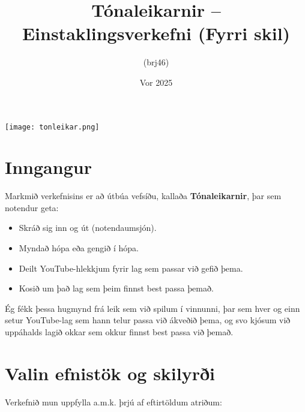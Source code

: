 \documentclass{article}
\title{Tónaleikarnir – Einstaklingsverkefni (Fyrri skil)}
\author{(brj46)}
\date{Vor 2025}
\begin{document}
\maketitle

\vspace{2em}

\begin{center}
    \texttt{[image: tonleikar.png]}
\end{center}

\newpage

\section{Inngangur}
Markmið verkefnisins er að útbúa vefsíðu, kallaða \textbf{Tónaleikarnir}, þar sem notendur geta:
\begin{itemize}
    \item Skráð sig inn og út (notendaumsjón).
    \item Myndað hópa eða gengið í hópa.
    \item Deilt YouTube-hlekkjum fyrir lag sem passar við gefið þema.
    \item Kosið um það lag sem þeim finnst best passa þemað. 
\end{itemize}

Ég fékk þessa hugmynd frá leik sem við spilum í vinnunni, þar sem hver og einn setur YouTube-lag sem hann telur passa við ákveðið þema, og svo kjósum við uppáhalds lagið okkar sem okkur finnst best passa við þemað.

\section{Valin efnistök og skilyrði}
Verkefnið mun uppfylla a.m.k. þrjú af eftirtöldum atriðum:
\end{document}
